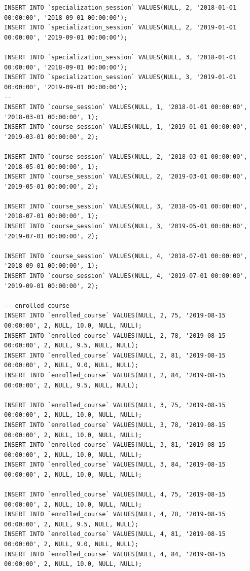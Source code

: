 \documentclass[12pt,a4paper,titlepage]{article}
\begin{document}
\begin{lstlisting}
INSERT INTO `specialization_session` VALUES(NULL, 2, '2018-01-01 00:00:00', '2018-09-01 00:00:00');
INSERT INTO `specialization_session` VALUES(NULL, 2, '2019-01-01 00:00:00', '2019-09-01 00:00:00');

INSERT INTO `specialization_session` VALUES(NULL, 3, '2018-01-01 00:00:00', '2018-09-01 00:00:00');
INSERT INTO `specialization_session` VALUES(NULL, 3, '2019-01-01 00:00:00', '2019-09-01 00:00:00');
--
INSERT INTO `course_session` VALUES(NULL, 1, '2018-01-01 00:00:00', '2018-03-01 00:00:00', 1);
INSERT INTO `course_session` VALUES(NULL, 1, '2019-01-01 00:00:00', '2019-03-01 00:00:00', 2);

INSERT INTO `course_session` VALUES(NULL, 2, '2018-03-01 00:00:00', '2018-05-01 00:00:00', 1);
INSERT INTO `course_session` VALUES(NULL, 2, '2019-03-01 00:00:00', '2019-05-01 00:00:00', 2);

INSERT INTO `course_session` VALUES(NULL, 3, '2018-05-01 00:00:00', '2018-07-01 00:00:00', 1);
INSERT INTO `course_session` VALUES(NULL, 3, '2019-05-01 00:00:00', '2019-07-01 00:00:00', 2);

INSERT INTO `course_session` VALUES(NULL, 4, '2018-07-01 00:00:00', '2018-09-01 00:00:00', 1);
INSERT INTO `course_session` VALUES(NULL, 4, '2019-07-01 00:00:00', '2019-09-01 00:00:00', 2);

-- enrolled course
INSERT INTO `enrolled_course` VALUES(NULL, 2, 75, '2019-08-15 00:00:00', 2, NULL, 10.0, NULL, NULL);
INSERT INTO `enrolled_course` VALUES(NULL, 2, 78, '2019-08-15 00:00:00', 2, NULL, 9.5, NULL, NULL);
INSERT INTO `enrolled_course` VALUES(NULL, 2, 81, '2019-08-15 00:00:00', 2, NULL, 9.0, NULL, NULL);
INSERT INTO `enrolled_course` VALUES(NULL, 2, 84, '2019-08-15 00:00:00', 2, NULL, 9.5, NULL, NULL);

INSERT INTO `enrolled_course` VALUES(NULL, 3, 75, '2019-08-15 00:00:00', 2, NULL, 10.0, NULL, NULL);
INSERT INTO `enrolled_course` VALUES(NULL, 3, 78, '2019-08-15 00:00:00', 2, NULL, 10.0, NULL, NULL);
INSERT INTO `enrolled_course` VALUES(NULL, 3, 81, '2019-08-15 00:00:00', 2, NULL, 10.0, NULL, NULL);
INSERT INTO `enrolled_course` VALUES(NULL, 3, 84, '2019-08-15 00:00:00', 2, NULL, 10.0, NULL, NULL);

INSERT INTO `enrolled_course` VALUES(NULL, 4, 75, '2019-08-15 00:00:00', 2, NULL, 10.0, NULL, NULL);
INSERT INTO `enrolled_course` VALUES(NULL, 4, 78, '2019-08-15 00:00:00', 2, NULL, 9.5, NULL, NULL);
INSERT INTO `enrolled_course` VALUES(NULL, 4, 81, '2019-08-15 00:00:00', 2, NULL, 9.0, NULL, NULL);
INSERT INTO `enrolled_course` VALUES(NULL, 4, 84, '2019-08-15 00:00:00', 2, NULL, 10.0, NULL, NULL);


\end{lstlisting}
\end{document}
